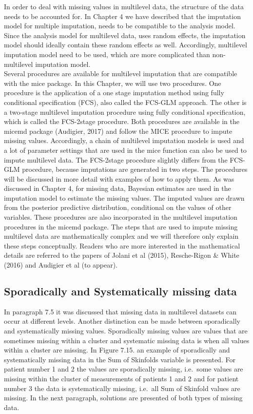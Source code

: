 \documentclass[]{book}
\begin{document}
In order to deal with missing values in multilevel data, the structure
of the data needs to be accounted for. In Chapter 4 we have described
that the imputation model for multiple imputation, needs to be
compatible to the analysis model. Since the analysis model for
multilevel data, uses random effects, the imputation model should
ideally contain these random effects as well. Accordingly, multilevel
imputation model need to be used, which are more complicated than
non-multilevel imputation model.\\
Several procedures are available for multilevel imputation that are
compatible with the mice package. In this Chapter, we will use two
procedures. One procedure is the application of a one stage imputation
method using fully conditional specification (FCS), also called the
FCS-GLM approach. The other is a two-stage multilevel imputation
procedure using fully conditional specification, which is called the
FCS-2stage procedure. Both procedures are available in the micemd
package (Audigier, 2017) and follow the MICE procedure to impute missing
values. Accordingly, a chain of multilevel imputation models is used and
a lot of parameter settings that are used in the mice function can also
be used to impute multilevel data. The FCS-2stage procedure slightly
differs from the FCS-GLM procedure, because imputations are generated in
two steps. The procedures will be discussed in more detail with examples
of how to apply them. As was discussed in Chapter 4, for missing data,
Bayesian estimates are used in the imputation model to estimate the
missing values. The imputed values are drawn from the posterior
predictive distribution, conditional on the values of other variables.
These procedures are also incorporated in the multilevel imputation
procedures in the micemd package. The steps that are used to impute
missing multilevel data are mathematically complex and we will therefore
only explain these steps conceptually. Readers who are more interested
in the mathematical details are referred to the papers of Jolani et al
(2015), Resche-Rigon \& White (2016) and Audigier et al (to appear).

\subsection{Sporadically and Systematically missing
data}\label{sporadically-and-systematically-missing-data-1}

In paragraph 7.5 it was discussed that missing data in multilevel
datasets can occur at different levels. Another distinction can be made
between sporadically and systematically missing values. Sporadically
missing values are values that are sometimes missing within a cluster
and systematic missing data is when all values within a cluster are
missing. In Figure 7.15. an example of sporadically and systematically
missing data in the Sum of Skinfolds variable is presented. For patient
number 1 and 2 the values are sporadically missing, i.e.~some values are
missing within the cluster of measurements of patients 1 and 2 and for
patient number 3 the data is systematically missing, i.e.~all Sum of
Skinfold values are missing. In the next paragraph, solutions are
presented of both types of missing data.
\end{document}
